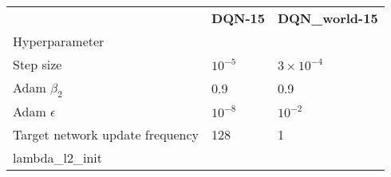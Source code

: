 \begin{tabular}{lll}
 & \bfseries DQN-15 & \bfseries DQN_world-15 \\
Hyperparameter &  &  \\
Step size & $10^{-5}$ & $3 \times 10^{-4}$ \\
Adam $\beta_2$ & 0.9 & 0.9 \\
Adam $\epsilon$ & $10^{-8}$ & $10^{-2}$ \\
Target network update frequency & 128 & 1 \\
lambda_l2_init &  &  \\
\end{tabular}
